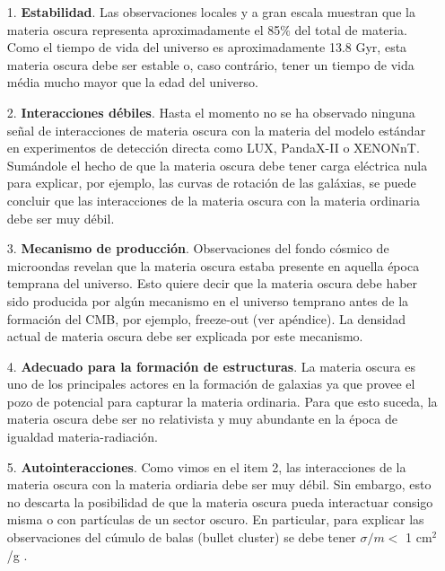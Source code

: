 \begin{itemize}
\item[1.] \textbf{Estabilidad}. Las observaciones locales y a gran escala muestran que la materia oscura representa aproximadamente el 85$\%$ del total de materia. Como el tiempo de vida del universo es aproximadamente 13.8 Gyr, esta materia oscura debe ser estable o, caso contrário, tener un tiempo de vida média mucho mayor que la edad del universo.
\item[2.] \textbf{Interacciones débiles}. Hasta el momento no se ha observado ninguna señal de interacciones de materia oscura con la materia del modelo estándar en experimentos de detección directa como LUX, PandaX-II o XENONnT. Sumándole el hecho de que la materia oscura debe tener carga eléctrica nula para explicar, por ejemplo, las curvas de rotación de las galáxias, se puede concluir que las interacciones de la materia oscura con la materia ordinaria debe ser muy débil. 
\item[3.] \textbf{Mecanismo de producción}. Observaciones del fondo cósmico de microondas revelan que la materia oscura estaba presente en aquella época temprana del universo. Esto quiere decir que la materia oscura debe haber sido producida por algún mecanismo en el universo temprano antes de la formación del CMB, por ejemplo, freeze-out (ver apéndice). La densidad actual de materia oscura debe ser explicada por este mecanismo.
\item[4.] \textbf{Adecuado para la formación de estructuras}. La materia oscura es uno de los principales actores en la formación de galaxias ya que provee el pozo de potencial para capturar la materia ordinaria. Para que esto suceda, la materia oscura debe ser no relativista y muy abundante en la época de igualdad materia-radiación. 
\item[5.] \textbf{Autointeracciones}. Como vimos en el item 2, las interacciones de la materia oscura con la materia ordiaria debe ser muy débil. Sin embargo, esto no descarta la posibilidad de que la materia oscura pueda interactuar consigo misma o con partículas de un sector oscuro. En particular, para explicar las observaciones del cúmulo de balas (bullet cluster) se debe tener $\sigma/m <$ 1 cm$^2$/g \cite{Markevitch:2003at}.
\end{itemize}


